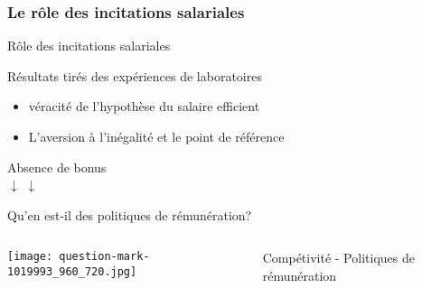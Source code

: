 \documentclass[serif]{beamer}
\begin{document}
\subsubsection{Le rôle des incitations salariales}
\begin{frame}{Rôle des incitations salariales }
\begin{block}{Résultats tirés des expériences de laboratoires}
\begin{itemize}
\item[\ding{52}] véracité de l'hypothèse du\textsf{ salaire efficient}
\item[\ding{52}] L'aversion à l'inégalité et le point de référence %
\end{itemize}
\end{block}
\begin{center}
Absence de bonus\\ 
$\downarrow$ $\downarrow$
\end{center}
\end{frame}
\begin{frame}{Qu'en est-il des politiques de rémunération? }
\begin{columns}
	\begin{column}{0.5\textwidth}
		\texttt{[image: question-mark-1019993\_960\_720.jpg]}
	\end{column}
	
	\begin{column}{0.5\textwidth}
	Compétivité - Politiques de rémunération
	\end{column}
\end{columns}
\end{frame}
\end{document}
